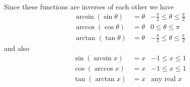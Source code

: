 Since these functions are inverses of each other we have
\begin{align*}
  \arcsin(\sin \theta) &= \theta & -\frac{\pi}{2} \leq \theta \leq \frac{\pi}{2} \\
  \arccos(\cos \theta) &= \theta & 0 \leq \theta \leq \pi \\
  \arctan(\tan \theta) &= \theta & -\frac{\pi}{2} \leq \theta \leq \frac{\pi}{2}	
\end{align*}
and also
\begin{align*}
  \sin(\arcsin x) &= x & -1 \leq x \leq 1 \\
  \cos(\arccos x) &= x & -1 \leq x \leq 1 \\
  \tan(\arctan x) &= x & \text{any real $x$}
\end{align*}

